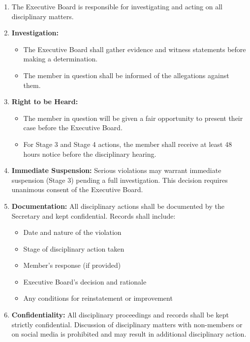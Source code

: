\begin{enumerate}[label=\alph*), leftmargin=2em, itemsep=0.3em]
    \item The Executive Board is responsible for investigating and acting on all disciplinary matters.
    
    \item \textbf{Investigation:}
    \begin{itemize}[leftmargin=1.5em, itemsep=0.2em]
        \item The Executive Board shall gather evidence and witness statements before making a determination.
        \item The member in question shall be informed of the allegations against them.
    \end{itemize}
    
    \item \textbf{Right to be Heard:}
    \begin{itemize}[leftmargin=1.5em, itemsep=0.2em]
        \item The member in question will be given a fair opportunity to present their case before the Executive Board.
        \item For Stage 3 and Stage 4 actions, the member shall receive at least 48 hours notice before the disciplinary hearing.
    \end{itemize}
    
    \item \textbf{Immediate Suspension:} Serious violations may warrant immediate suspension (Stage 3) pending a full investigation. This decision requires unanimous consent of the Executive Board.
    
    \item \textbf{Documentation:} All disciplinary actions shall be documented by the Secretary and kept confidential. Records shall include:
    \begin{itemize}[leftmargin=1.5em, itemsep=0.2em]
        \item Date and nature of the violation
        \item Stage of disciplinary action taken
        \item Member's response (if provided)
        \item Executive Board's decision and rationale
        \item Any conditions for reinstatement or improvement
    \end{itemize}
    
    \item \textbf{Confidentiality:} All disciplinary proceedings and records shall be kept strictly confidential. Discussion of disciplinary matters with non-members or on social media is prohibited and may result in additional disciplinary action.
    

\end{enumerate}
